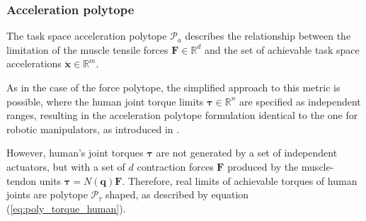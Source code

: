 \subsubsection{Acceleration polytope}
\label{ch:human_aceleration_poly}

The task space acceleration polytope $\mathcal{P}_a$ describes the relationship between the limitation of the muscle tensile forces $\bm{F}\in \mathbb{R}^d$ and the set of achievable task space accelerations $\ddot{\bm{x}}\in\mathbb{R}^m$.

As in the case of the force polytope, the simplified approach to this metric is possible, where the human joint torque limits $\bm{\tau}\in\mathbb{R}^n$ are specified as independent ranges, resulting in the acceleration polytope formulation identical to the one for robotic manipulators, as introduced in . 

However, human's joint torques $\bm{\tau}$ are not generated by a set of independent actuators, but with a set of $d$ contraction forces $\bm{F}$ produced by the muscle-tendon units $\bm{\tau}=N(\bm{q}) \bm{F}$. Therefore, real limits of achievable torques of human joints are polytope $\mathcal{P}_\tau$ shaped, as described by equation (\ref{eq:poly_torque_human}). 

